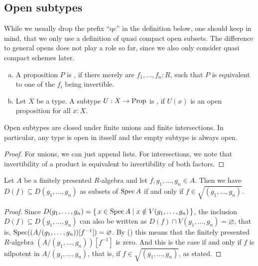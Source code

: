 \subsection{Open subtypes}

While we usually drop the prefix ``qc'' in the definition below,
one should keep in mind, that we only use a definition of quasi compact open subsets.
The difference to general opens does not play a role so far,
since we also only consider quasi compact schemes later.

\begin{definition}%
  \label{def:qc-open}
  \begin{enumerate}[(a)]
  \item A proposition $P$ is , if there merely are $f_1,\dots,f_n:R$,
    such that $P$ is equivalent to one of the $f_i$ being invertible.
  \item Let $X$ be a type.
    A subtype $U:X\to\mathrm{Prop}$ is , if $U(x)$ is an open proposition for all $x:X$.
  \end{enumerate}
\end{definition}

\begin{proposition}%
  \label{prop:open-union-intersection}
  Open subtypes are closed under finite unions and finite intersections.
  In particular, any type is open in itsself and the empty subtype is always open.
\end{proposition}

\begin{proof}
  For unions, we can just append lists.
  For intersections, we note that invertibility of a product
  is equivalent to invertibility of both factors.
\end{proof}

\begin{lemma}%
  Let $A$ be a finitely presented $R$-algebra
  and let $f, g_1, \dots, g_n \in A$.
  Then we have $D(f) \subseteq D(g_1, \dots, g_n)$
  as subsets of $\operatorname{Spec} A$
  if and only if $f \in \sqrt{(g_1, \dots, g_n)}$.
\end{lemma}

\begin{proof}
  Since $D(g_1, \dots, g_n) = \{\, x \in \operatorname{Spec} A \mid x \notin V(g_1, \dots, g_n) \,\}$,
  the inclusion $D(f) \subseteq D(g_1, \dots, g_n)$
  can also be written as
  $D(f) \cap V(g_1, \dots, g_n) = \varnothing$, that is,
  $\operatorname{Spec}((A/(g_1, \dots, g_n))[f^{-1}]) = \varnothing$.
  By ()
  this means that the finitely presented $R$-algebra $(A/(g_1, \dots, g_n))[f^{-1}]$
  is zero.
  And this is the case if and only if $f$ is nilpotent in $A/(g_1, \dots, g_n)$,
  that is, if $f \in \sqrt{(g_1, \dots, g_n)}$, as stated.
\end{proof}

